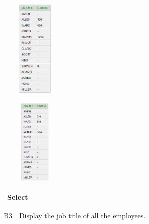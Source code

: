\begin{center}
  
\includegraphics[width=3.281cm,height=4.748cm]{images/img (18).png}

\end{center}
\begin{center}
  
\includegraphics[width=3.27cm,height=4.12cm]{images/img (19).png}

\end{center}
\begin{flushleft}
\tablefirsthead{}
\tablehead{}
\tabletail{}
\tablelasttail{}
\begin{supertabular}{|m{7.051cm}|}
\hline
Select 

\\\hline
\end{supertabular}
\end{flushleft}

B3\ \ Display the job title of all the employees.

